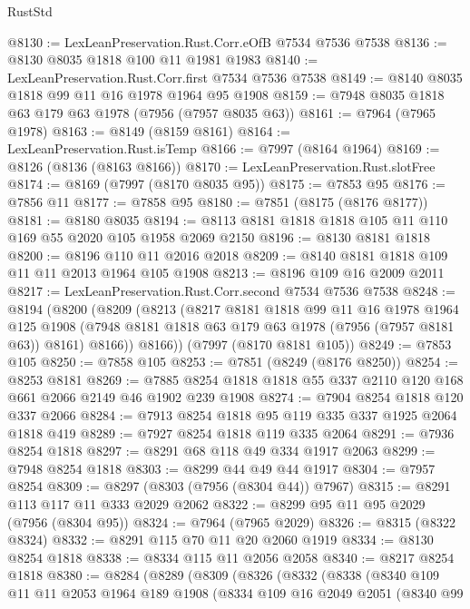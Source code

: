 \begin{lexlean}{RustStd}
\begin{coremodule}
@8130 := LexLeanPreservation.Rust.Corr.eOfB @7534 @7536 @7538
@8136 := @8130 @8035 @1818 @100 @11 @1981 @1983
@8140 := LexLeanPreservation.Rust.Corr.first @7534 @7536 @7538
@8149 := @8140 @8035 @1818 @99 @11 @16 @1978 @1964 @95 @1908
@8159 := @7948 @8035 @1818 @63 @179 @63 @1978 (@7956 (@7957 @8035 @63))
@8161 := @7964 (@7965 @1978)
@8163 := @8149 (@8159 @8161)
@8164 := LexLeanPreservation.Rust.isTemp
@8166 := @7997 (@8164 @1964)
@8169 := @8126 (@8136 (@8163 @8166))
@8170 := LexLeanPreservation.Rust.slotFree
@8174 := @8169 (@7997 (@8170 @8035 @95))
@8175 := @7853 @95
@8176 := @7856 @11
@8177 := @7858 @95
@8180 := @7851 (@8175 (@8176 @8177))
@8181 := @8180 @8035
@8194 := @8113 @8181 @1818 @1818 @105 @11 @110 @169 @55 @2020 @105 @1958 @2069 @2150
@8196 := @8130 @8181 @1818
@8200 := @8196 @110 @11 @2016 @2018
@8209 := @8140 @8181 @1818 @109 @11 @11 @2013 @1964 @105 @1908
@8213 := @8196 @109 @16 @2009 @2011
@8217 := LexLeanPreservation.Rust.Corr.second @7534 @7536 @7538
@8248 := @8194
    (@8200
      (@8209
        (@8213
          (@8217
            @8181
            @1818
            @99
            @11
            @16
            @1978
            @1964
            @125
            @1908
            (@7948 @8181 @1818 @63 @179 @63 @1978 (@7956 (@7957 @8181 @63)) @8161)
            @8166))
        @8166))
    (@7997 (@8170 @8181 @105))
@8249 := @7853 @105
@8250 := @7858 @105
@8253 := @7851 (@8249 (@8176 @8250))
@8254 := @8253 @8181
@8269 := @7885 @8254 @1818 @1818 @55 @337 @2110 @120 @168 @661 @2066 @2149 @46 @1902 @239 @1908
@8274 := @7904 @8254 @1818 @120 @337 @2066
@8284 := @7913 @8254 @1818 @95 @119 @335 @337 @1925 @2064 @1818 @419
@8289 := @7927 @8254 @1818 @119 @335 @2064
@8291 := @7936 @8254 @1818
@8297 := @8291 @68 @118 @49 @334 @1917 @2063
@8299 := @7948 @8254 @1818
@8303 := @8299 @44 @49 @44 @1917
@8304 := @7957 @8254
@8309 := @8297 (@8303 (@7956 (@8304 @44)) @7967)
@8315 := @8291 @113 @117 @11 @333 @2029 @2062
@8322 := @8299 @95 @11 @95 @2029 (@7956 (@8304 @95))
@8324 := @7964 (@7965 @2029)
@8326 := @8315 (@8322 @8324)
@8332 := @8291 @115 @70 @11 @20 @2060 @1919
@8334 := @8130 @8254 @1818
@8338 := @8334 @115 @11 @2056 @2058
@8340 := @8217 @8254 @1818
@8380 := @8284
    (@8289
      (@8309
        (@8326
          (@8332
            (@8338
              (@8340
                @109
                @11
                @11
                @2053
                @1964
                @189
                @1908
                (@8334
                  @109
                  @16
                  @2049
                  @2051
                  (@8340
                    @99

\end{coremodule}
\end{lexlean}
